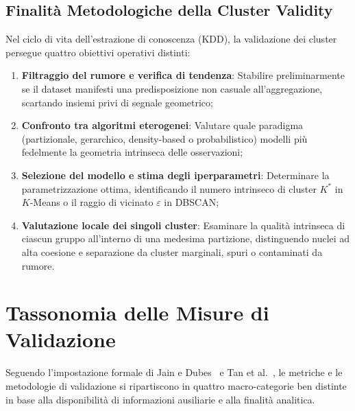 \subsection{Finalità Metodologiche della Cluster Validity}
Nel ciclo di vita dell'estrazione di conoscenza (KDD), la validazione dei cluster persegue quattro obiettivi operativi distinti:
\begin{enumerate}
    \item \textbf{Filtraggio del rumore e verifica di tendenza}: Stabilire preliminarmente se il dataset manifesti una predisposizione non casuale all'aggregazione, scartando insiemi privi di segnale geometrico;
    \item \textbf{Confronto tra algoritmi eterogenei}: Valutare quale paradigma (partizionale, gerarchico, density-based o probabilistico) modelli più fedelmente la geometria intrinseca delle osservazioni;
    \item \textbf{Selezione del modello e stima degli iperparametri}: Determinare la parametrizzazione ottima, identificando il numero intrinseco di cluster $K^*$ in $K$-Means o il raggio di vicinato $\varepsilon$ in DBSCAN;
    \item \textbf{Valutazione locale dei singoli cluster}: Esaminare la qualità intrinseca di ciascun gruppo all'interno di una medesima partizione, distinguendo nuclei ad alta coesione e separazione da cluster marginali, spuri o contaminati da rumore.
\end{enumerate}

\FloatBarrier
\section{Tassonomia delle Misure di Validazione}
\label{sec:dm-validity-taxonomy}

Seguendo l'impostazione formale di Jain e Dubes~\cite{jain1988} e Tan et al.~\cite{tan2018}, le metriche e le metodologie di validazione si ripartiscono in quattro macro-categorie ben distinte in base alla disponibilità di informazioni ausiliarie e alla finalità analitica.

